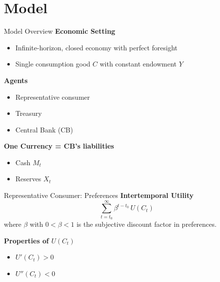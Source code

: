 \documentclass[11pt,aspectratio=169]{beamer}
\begin{document}
\section{Model}

\begin{frame}{Model Overview}
\textbf{Economic Setting}
\begin{itemize}
  \item Infinite-horizon, closed economy with perfect foresight
  \item Single consumption good $C$ with constant endowment $Y$
\end{itemize}

\textbf{Agents}
\begin{itemize}
  \item Representative consumer
  \item Treasury
  \item Central Bank (CB)
\end{itemize}

\textbf{One Currency = CB's liabilities}
\begin{itemize}
  \item Cash $M_t$
  \item Reserves $X_t$
\end{itemize}
\end{frame}

\begin{frame}{Representative Consumer: Preferences}
\textbf{Intertemporal Utility}
\begin{equation}
\sum_{t=t_0}^{\infty} \beta^{t-t_0} \, U(C_t) 
\label{eq: utility}
\end{equation}
where $\beta$ with $0<\beta<1$ is the subjective discount factor in preferences.

\vspace{0.5cm}
\textbf{Properties of $U(C_t)$}
\begin{itemize}
  \item $U'(C_t) > 0$
  \item $U''(C_t) < 0$
\end{itemize}
\end{frame}
\end{document}
